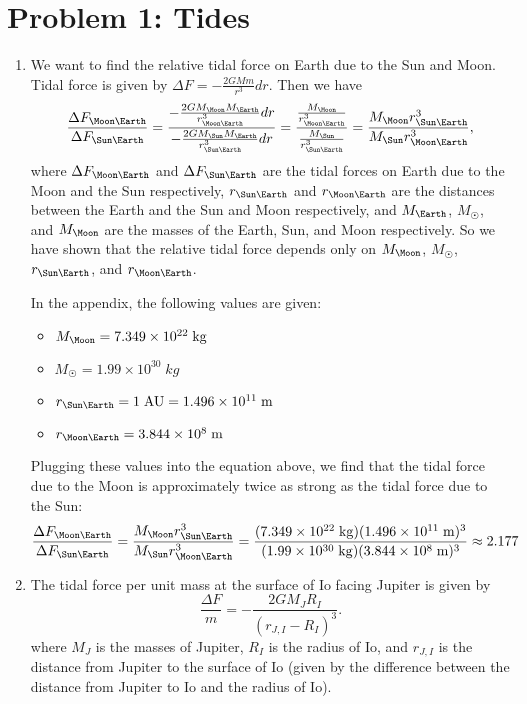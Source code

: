 \documentclass[11pt,letterpaper]{article}
\begin{document}
\section*{Problem 1: Tides}

\begin{enumerate}[label=(\alph*)]
    \item
    We want to find the relative tidal force on Earth due to the Sun and Moon. Tidal force is given by $\Delta F = -\frac{2GMm}{r^3}dr.$ Then we have $$\frac{\Delta F_{\Moon\Earth}}{\Delta F_{\Sun\Earth}} = \frac{-\frac{2GM_\Moon M_\Earth}{r_{\Moon\Earth}^3}dr}{-\frac{2GM_\Sun M_\Earth}{r_{\Sun\Earth}^3}dr} = \frac{\frac{M_\Moon}{r_{\Moon\Earth}^3}}{\frac{M_\Sun}{r_{\Sun\Earth}^3}} = \frac{M_\Moon r_{\Sun\Earth}^3}{M_\Sun r_{\Moon\Earth}^3},$$
    where $\Delta F_{\Moon\Earth}$ and $\Delta F_{\Sun\Earth}$ are the tidal forces on Earth due to the Moon and the Sun respectively, $r_{\Sun\Earth}$ and $r_{\Moon\Earth}$ are the distances between the Earth and the Sun and Moon respectively, and $M_\Earth$, $M_\Sun$, and $M_\Moon$ are the masses of the Earth, Sun, and Moon respectively. So we have shown that the relative tidal force depends only on $M_\Moon$, $M_\Sun$, $r_{\Sun\Earth}$, and $r_{\Moon\Earth}$. 
    
    In the appendix, the following values are given:
    \begin{itemize}
        \item $M_\Moon = 7.349\times 10^{22}\;\si{kg}$
        \item $M_\Sun = 1.99\times 10^{30}\;\si{kg}$
        \item $r_{\Sun\Earth} = 1\;\si{AU} = 1.496\times 10^{11}\;\si{m}$
        \item $r_{\Moon\Earth} = 3.844\times 10^8\;\si{m}$
    \end{itemize}
  
    Plugging these values into the equation above, we find that the tidal force due to the Moon is approximately twice as strong as the tidal force due to the Sun: $$\frac{\Delta F_{\Moon\Earth}}{\Delta F_{\Sun\Earth}} = \frac{M_\Moon r_{\Sun\Earth}^3}{M_\Sun r_{\Moon\Earth}^3} = \frac{(7.349\times 10^{22}\;\si{kg})(1.496\times 10^{11}\;\si{m})^3}{(1.99\times 10^{30}\;\si{kg})(3.844\times 10^8\;\si{m})^3} \approx 2.177$$
    
    \item
    The tidal force per unit mass at the surface of Io facing Jupiter is given by $$\frac{\Delta F}{m} = -\frac{2GM_JR_I}{(r_{J,I} - R_I)^3}.$$ where $M_J$ is the masses of Jupiter, $R_I$ is the radius of Io, and $r_{J, I}$ is the distance from Jupiter to the surface of Io (given by the difference between the distance from Jupiter to Io and the radius of Io).
    

\end{enumerate}
\end{document}
